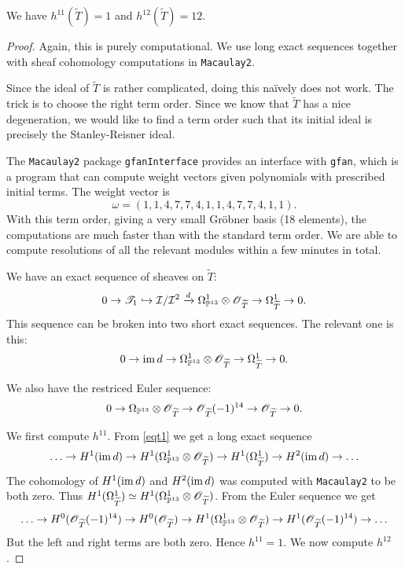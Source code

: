 \documentclass[11pt, english]{article}
\begin{document}
\begin{thm}
  We have $h^{11}(\widetilde T)=1$ and $h^{12}(\widetilde T)=12$. 
\end{thm}
\begin{proof}
Again, this is purely computational. We use long exact sequences together with sheaf cohomology computations in \verb|Macaulay2|.

Since the ideal of $\widetilde T$ is rather complicated, doing this naïvely does not work. The trick is to choose the right term order. Since we know that $\widetilde T$ has a nice degeneration, we would like to find a term order such that its initial ideal is precisely the Stanley-Reisner ideal.

The \verb|Macaulay2| package \verb|gfanInterface| provides an interface with \verb|gfan|, which is a program that can compute weight vectors given polynomials with prescribed initial terms. The weight vector is 
\[ \omega = (1, 1, 4, 7, 7, 4, 1, 1, 4, 7, 7, 4, 1, 1). \]
With this term order, giving a very small Gröbner basis (18 elements), the computations are much faster than with the standard term order. We are able to compute resolutions of all the relevant modules within a few minutes in total.

We have an exact sequence of sheaves on $\widetilde T$:
\[
0 \to \mathscr T_1 \hookrightarrow \mathcal I/\mathcal I^2 \xrightarrow{d} \Omega_{\mathbb{P}^{13}}^1 \otimes \operatorname{\mathscr{O}}_{\widetilde T} \to \Omega_{\widetilde T}^1 \to 0.
\]
This sequence can be broken into two short exact sequences. The relevant one is this:
\begin{equation}
\label{eqt1}
0 \to \operatorname{im} d \to \Omega_{\mathbb{P}^{13}}^1 \otimes \operatorname{\mathscr{O}}_{\widetilde T} \to \Omega_{\widetilde T}^1 \to 0.  
\end{equation}

We also have the restriced Euler sequence:
\begin{equation}
\label{eqeuler}
0 \to \Omega_{\mathbb{P}^{13}} \otimes \operatorname{\mathscr{O}}_{\widetilde T} \to \operatorname{\mathscr{O}}_{\widetilde T}(-1)^{14} \to \operatorname{\mathscr{O}}_{\widetilde   T} \to 0.
\end{equation}

We first compute $h^{11}$. From \eqref{eqt1}  we get a long exact sequence
\[
\ldots \to H^1(\operatorname{im} d) \to H^1(\Omega_{\mathbb{P}^{13}}^1 \otimes \operatorname{\mathscr{O}}_{\widetilde T}) \to H^1(\Omega_{\widetilde T}^1) \to H^2(\operatorname{im} d) \to \ldots 
\]
The cohomology of $H^1(\operatorname{im} d)$ and $H^2(\operatorname{im} d)$ was computed with \verb|Macaulay2| to be both zero. Thus $H^1(\Omega_{\widetilde T}^1) \simeq H^1(\Omega_{\mathbb{P}^{13}}^1 \otimes \operatorname{\mathscr{O}}_{\widetilde T})$. From the Euler sequence we get 
\[
\ldots \to H^0(\operatorname{\mathscr{O}}_{\widetilde T}(-1)^{14}) \to H^0(\operatorname{\mathscr{O}}_{\widetilde T}) \to H^1(\Omega_{\mathbb{P}^{13}}^1 \otimes \operatorname{\mathscr{O}}_{\widetilde T}) \to H^1(\operatorname{\mathscr{O}}_{\widetilde T}(-1)^{14}) \to \ldots
\]
But the left and right terms are both zero. Hence $h^{11}=1$. We now compute $h^{12}$. 


\end{proof}
\end{document}
